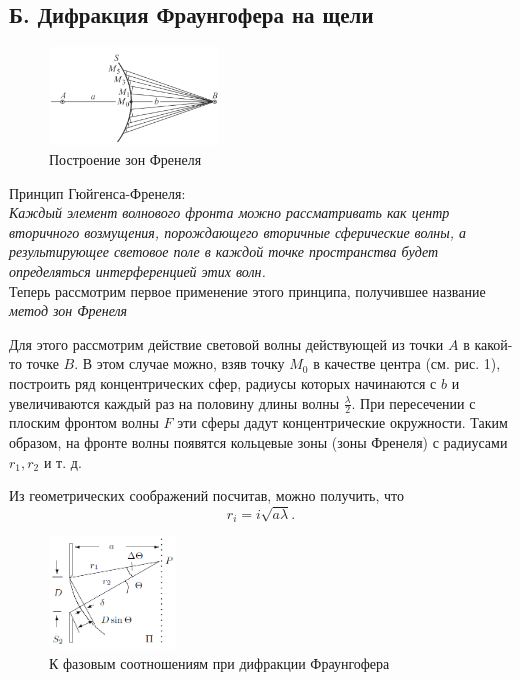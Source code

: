 \documentclass[a4paper,12pt]{article}
\begin{document}
	\subsection*{Б. Дифракция Фраунгофера на щели}
	\begin{figure}
		\begin{center}
			\includegraphics[width = 0.4\textwidth]{431-2.png}
		\end{center}
		\caption{Построение зон Френеля}
	\end{figure}
	Принцип Гюйгенса-Френеля:\\
	\textit{Каждый элемент волнового фронта можно рассматривать как центр  вторичного возмущения, порождающего вторичные сферические волны, а результирующее световое поле  в каждой точке пространства будет определяться интерференцией этих волн.}\\
	Теперь рассмотрим первое применение этого принципа, получившее название \textit{метод зон Френеля}
	

	Для этого рассмотрим действие световой волны действующей из точки $A$ в какой-то точке $B$.
	В этом случае можно, взяв точку $M_0$ в качестве центра (см. рис. 1), построить ряд концентрических сфер, радиусы которых начинаются с $b$ и увеличиваются каждый раз на половину длины волны $\frac{\lambda}{2}$. При пересечении с плоским фронтом волны $F$ эти сферы дадут концентрические окружности. Таким образом, на фронте волны появятся кольцевые зоны (зоны Френеля) с радиусами $r_1, r_2$ и т. д.
	
	Из геометрических соображений посчитав, можно получить, что 
	\begin{equation}
	r_i = i \sqrt{a \lambda}.
	\end{equation}
		\begin{figure}
		\begin{center}
			\includegraphics[width = 0.3\textwidth]{431-3.png}
		\end{center}
		\caption{К фазовым соотношениям при дифракции Фраунгофера}
	\end{figure}
	
\end{document}
